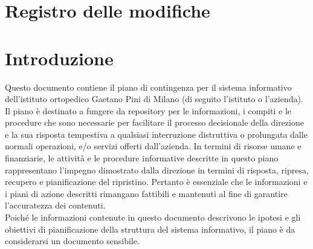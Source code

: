 \documentclass[12pt, a4paper, titlepage]{report}
\begin{document}
	
	\begin{frontespizio}
		\begin{Preambolo*}
			\usepackage{fourier}
		\end{Preambolo*}
	\end{frontespizio}

\section*{Registro delle modifiche}
	\renewcommand*{\arraystretch}{1.5}
	
	
	\setcounter{page}{2}
	\tableofcontents
	\newpage
	\listoffigures
	\newpage
	\listoftables
	\setcounter{table}{0}
	\newpage	    
	\renewcommand*{\arraystretch}{2}
	\pagestyle{fancy}
	\fancyhf{}
	\cfoot{\thepage}
	\section{Introduzione} \label{introduzione}
	
	Questo documento contiene il piano di contingenza per il sistema informativo dell'istituto 
	ortopedico Gaetano Pini di Milano (di seguito l'istituto o l'azienda). Il piano è destinato a fungere da repository per le informazioni, i compiti e le procedure che sono necessarie per facilitare il processo decisionale della direzione e la sua risposta tempestiva a qualsiasi interruzione distruttiva o prolungata dalle normali operazioni, e/o servizi offerti dall'azienda.
	In termini di risorse umane e finanziarie, le attività e le procedure informative descritte in questo piano rappresentano l'impegno dimostrato dalla direzione in termini di risposta, ripresa, recupero e pianificazione del ripristino. Pertanto è essenziale che le informazioni e i piani di azione descritti rimangano fattibili e mantenuti al fine di garantire l'accuratezza dei contenuti. \\
	Poiché le informazioni contenute in questo documento descrivono le ipotesi e gli obiettivi di pianificazione della struttura del sistema informativo, il piano è da considerarsi un documento sensibile. 
	
\end{document}
